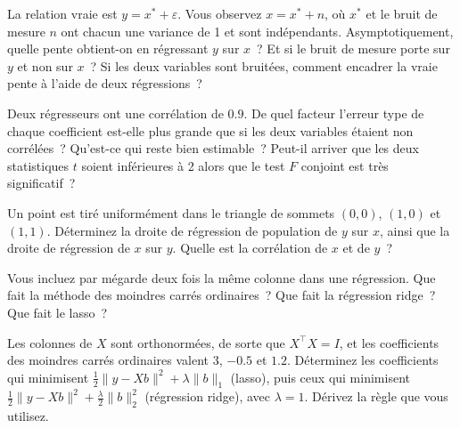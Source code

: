 \begin{question}\label{iq:iv1:regression:10}
La relation vraie est $y = x^* + \varepsilon$. Vous observez $x = x^* + n$, où $x^*$ et le bruit de mesure $n$ ont chacun une variance de 1 et sont indépendants. Asymptotiquement, quelle pente obtient-on en régressant $y$ sur $x$~? Et si le bruit de mesure porte sur $y$ et non sur $x$~? Si les deux variables sont bruitées, comment encadrer la vraie pente à l'aide de deux régressions~?
\end{question}

\begin{question}\label{iq:iv1:regression:11}
Deux régresseurs ont une corrélation de $0.9$. De quel facteur l'erreur type de chaque coefficient est-elle plus grande que si les deux variables étaient non corrélées~? Qu'est-ce qui reste bien estimable~? Peut-il arriver que les deux statistiques $t$ soient inférieures à 2 alors que le test $F$ conjoint est très significatif~?
\end{question}

\begin{question}\label{iq:iv1:regression:12}
Un point est tiré uniformément dans le triangle de sommets $(0,0)$, $(1,0)$ et $(1,1)$. Déterminez la droite de régression de population de $y$ sur $x$, ainsi que la droite de régression de $x$ sur $y$. Quelle est la corrélation de $x$ et de $y$~?
\end{question}

\begin{question}\label{iq:iv1:regression:13}
Vous incluez par mégarde deux fois la même colonne dans une régression. Que fait la méthode des moindres carrés ordinaires~? Que fait la régression ridge~? Que fait le lasso~?
\end{question}

\begin{question}\label{iq:iv1:regression:14}
Les colonnes de $X$ sont orthonormées, de sorte que $X^\top X = I$, et les coefficients des moindres carrés ordinaires valent $3$, $-0.5$ et $1.2$. Déterminez les coefficients qui minimisent $\tfrac12\lVert y - Xb\rVert^2 + \lambda\lVert b\rVert_1$ (lasso), puis ceux qui minimisent $\tfrac12\lVert y - Xb\rVert^2 + \tfrac{\lambda}{2}\lVert b\rVert_2^2$ (régression ridge), avec $\lambda = 1$. Dérivez la règle que vous utilisez.
\end{question}

